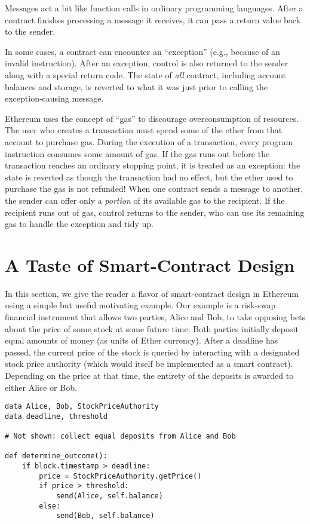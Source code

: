 \documentclass[10pt,twocolumn,letterpaper]{article}
\begin{document}
Messages act a bit like function calls in ordinary programming languages. After a contract finishes processing a message it receives, it can pass a return value back to the sender.

In some cases, a contract can encounter an ``exception'' (e.g., because of an invalid instruction). After an exception, control is also returned to the sender along with a special return code. The state of \emph{all} contract, including account balances and storage, is reverted to what it was just prior to calling the exception-causing message.

Ethereum uses the concept of ``gas'' to discourage overconsumption of resources. The user who creates a transaction must spend some of the ether from that account to purchase gas. During the execution of a transaction, every program instruction consumes some amount of gas. If the gas runs out before the transaction reaches an ordinary stopping point, it is treated as an exception: the state is reverted as though the transaction had no effect, but the ether used to purchase the gas is not refunded! When one contract sends a message to another, the sender can offer only a \emph{portion} of its available gas to the recipient. If the recipient runs out of gas, control returns to the sender, who can use its remaining gas to handle the exception and tidy up.


\section{A Taste of Smart-Contract Design}

In this section, we give the reader a flavor of smart-contract design in Ethereum using a simple but useful motivating example. Our example is a risk-swap financial instrument that allows two parties, Alice and Bob, to take opposing bets about the price of some stock at some future time. Both parties initially deposit equal amounts of money (as units of Ether currency). After a deadline has passed, the current price of the stock is queried by interacting with a designated stock price authority (which would itself be implemented as a smart contract). Depending on the price at that time, the entirety of the deposits is awarded to either Alice or Bob.

\begin{mdframed}
\begin{verbatim}
data Alice, Bob, StockPriceAuthority
data deadline, threshold

# Not shown: collect equal deposits from Alice and Bob

def determine_outcome():
    if block.timestamp > deadline: 
        price = StockPriceAuthority.getPrice()
        if price > threshold:
            send(Alice, self.balance)
        else:
            send(Bob, self.balance)
\end{verbatim}
\end{mdframed}
\end{document}
